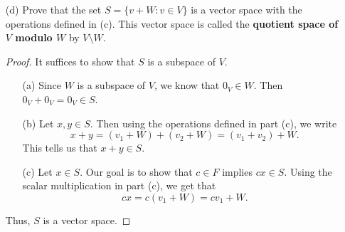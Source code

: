 \begin{enumerate}
\begin{proof}
        \end{proof}
    \item[(d)] Prove that the set \( S = \{ v + W : v \in V   \}   \) is a vector space with the operations defined in (c). This vector space is called the \textbf{quotient space of \( V  \) modulo \( W \) } by \( V \setminus W   \).
        \begin{proof}
        It suffices to show that \( S  \) is a subspace of \( V  \). 
        \begin{enumerate}
            \item[(a)] Since \( W  \) is a subspace of \( V  \), we know that \( 0_{V} \in W   \). Then \( 0_{V} + 0_{V} = 0_{V} \in S  \).
            \item[(b)] Let \( x,y \in S  \). Then using the operations defined in part (c), we write
                \[  x + y = (v_{1} + W) + (v_{2} + W) = (v_{1} + v_{2}) + W.  \]
                This tells us that \( x + y \in S  \).
            \item[(c)] Let \( x \in S  \). Our goal is to show that \( c \in F  \) implies \( cx \in S  \). Using the scalar multiplication in part (c), we get that
                \[ cx = c(v_{1} + W) = cv_{1} + W.   \]
        \end{enumerate}
        Thus, \( S  \) is a vector space.
        \end{proof}
\end{enumerate}


